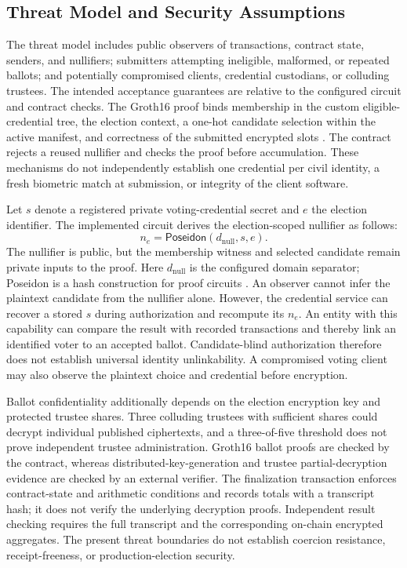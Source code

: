 \subsection{Threat Model and Security Assumptions}
\label{subsec:system-security-objectives}

The threat model includes public observers of transactions, contract state,
senders, and nullifiers; submitters attempting ineligible, malformed, or repeated
ballots; and potentially compromised clients, credential custodians, or colluding
trustees. The intended acceptance guarantees are relative to the configured circuit
and contract checks. The Groth16 proof binds membership in the custom
eligible-credential tree, the election context, a one-hot candidate selection
within the active manifest, and correctness of the submitted encrypted slots
\citep{groth2016snark}. The contract rejects a reused nullifier and checks the
proof before accumulation. These mechanisms do not independently establish one
credential per civil identity, a fresh biometric match at submission, or integrity
of the client software.

Let $s$ denote a registered private voting-credential secret and $e$ the election
identifier. The implemented circuit derives the election-scoped nullifier as
follows:
\begin{equation}
  n_e = \mathsf{Poseidon}(d_{\mathrm{null}},s,e).
  \label{eq:system-nullifier}
\end{equation}
The nullifier is public, but the membership witness and selected candidate remain
private inputs to the proof. Here $d_{\mathrm{null}}$ is the configured domain
separator; Poseidon is a hash construction for proof circuits
\citep{grassi2021poseidon}. An observer cannot infer the plaintext candidate from
the nullifier alone. However, the credential service can recover a stored $s$
during authorization and recompute its $n_e$. An entity with this capability can
compare the result with recorded transactions and thereby link an identified voter
to an accepted ballot. Candidate-blind authorization therefore does not establish
universal identity unlinkability. A compromised voting client may also observe the
plaintext choice and credential before encryption.

Ballot confidentiality additionally depends on the election encryption key and
protected trustee shares. Three colluding trustees with sufficient shares could
decrypt individual published ciphertexts, and a three-of-five threshold does not
prove independent trustee administration. Groth16 ballot proofs are checked by the
contract, whereas distributed-key-generation and trustee partial-decryption
evidence are checked by an external verifier. The finalization transaction enforces
contract-state and arithmetic conditions and records totals with a transcript hash;
it does not verify the underlying decryption proofs. Independent result checking
requires the full transcript and the corresponding on-chain encrypted aggregates.
The present threat boundaries do not establish coercion resistance,
receipt-freeness, or production-election security.

